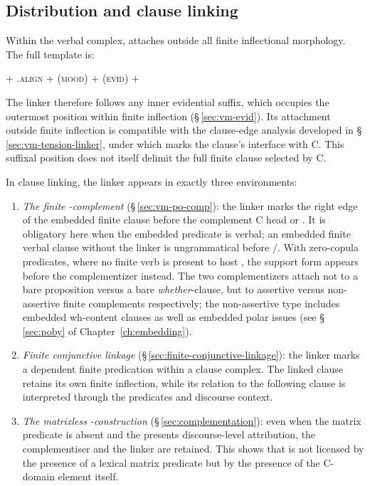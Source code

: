\subsection{Distribution and clause linking}

Within the verbal complex,  attaches outside all finite inflectional
morphology. The full template is:

\begin{center}
\Stem{} + .\textsc{align} + (\textsc{mood}) +
(\textsc{evid}) + 
\end{center}

\noindent The linker therefore follows any inner evidential suffix, which
occupies the outermost position within finite inflection
(§\,\ref{sec:vm-evid}). Its attachment outside finite inflection is
compatible with the clause-edge analysis developed in
§\,\ref{sec:vm-tension-linker}, under which  marks the clause's
interface with C. This suffixal position does not itself delimit the full
finite clause selected by C.

In clause linking, the linker appears in exactly three environments:

\begin{enumerate}
  \item \textit{The finite -complement} (§\,\ref{sec:vm-po-comp}): the
    linker marks the right edge of the embedded finite clause before the
    complement C head  or . It is obligatory here when the
    embedded predicate is verbal; an embedded finite verbal clause without the
    linker is ungrammatical before /. With zero-copula
    predicates, where no finite verb is present to host , the support
    form  appears before the complementizer instead. The two
    complementizers attach not to a bare proposition versus a bare
    \textit{whether}-clause, but to assertive versus non-assertive finite
    complements respectively; the non-assertive type includes embedded
    wh-content clauses as well as embedded polar issues (see §\,\ref{sec:poby}
    of Chapter~\ref{ch:embedding}).

  \item \textit{Finite conjunctive linkage}
    (§\,\ref{sec:finite-conjunctive-linkage}): the linker marks a dependent
    finite predication within a clause complex. The linked clause retains its
    own finite inflection, while its relation to the following clause is
    interpreted through the predicates and discourse context.

  \item \textit{The matrixless -construction}
    (§\,\ref{sec:complementation}): even when the matrix predicate is absent and
    the  presents discourse-level attribution, the complementiser
     and the linker  are retained. This shows that  is not
    licensed by the presence of a lexical matrix predicate but by the presence
    of the C-domain element  itself.
\end{enumerate}

